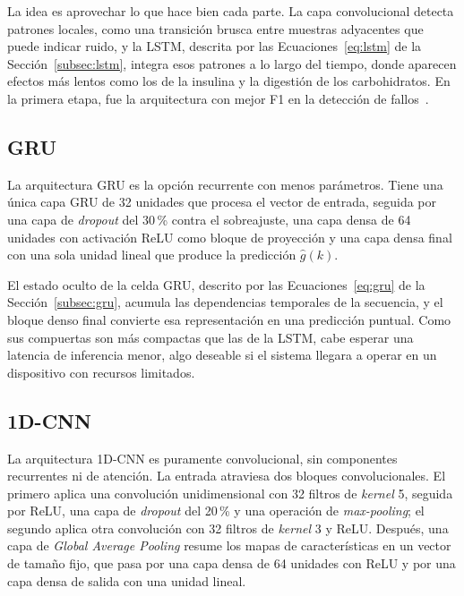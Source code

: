\documentclass{report}
\begin{document}
La idea es aprovechar lo que hace bien cada parte. La capa convolucional detecta patrones locales, como una transición brusca entre muestras adyacentes que puede indicar ruido, y la LSTM, descrita por las Ecuaciones~\eqref{eq:lstm} de la Sección~\ref{subsec:lstm}, integra esos patrones a lo largo del tiempo, donde aparecen efectos más lentos como los de la insulina y la digestión de los carbohidratos. En la primera etapa, fue la arquitectura con mejor F1 en la detección de fallos~\cite{sanchez2025imputation}.

\subsection{GRU}
\label{subsec:arq_gru}

La arquitectura GRU es la opción recurrente con menos parámetros. Tiene una única capa GRU de 32 unidades que procesa el vector de entrada, seguida por una capa de \textit{dropout} del 30\,\% contra el sobreajuste, una capa densa de 64 unidades con activación ReLU como bloque de proyección y una capa densa final con una sola unidad lineal que produce la predicción $\hat{g}(k)$.

El estado oculto de la celda GRU, descrito por las Ecuaciones~\eqref{eq:gru} de la Sección~\ref{subsec:gru}, acumula las dependencias temporales de la secuencia, y el bloque denso final convierte esa representación en una predicción puntual. Como sus compuertas son más compactas que las de la LSTM, cabe esperar una latencia de inferencia menor, algo deseable si el sistema llegara a operar en un dispositivo con recursos limitados.


\subsection{1D-CNN}
\label{subsec:arq_1dcnn}

La arquitectura 1D-CNN es puramente convolucional, sin componentes recurrentes ni de atención. La entrada atraviesa dos bloques convolucionales. El primero aplica una convolución unidimensional con 32 filtros de \textit{kernel} 5, seguida por ReLU, una capa de \textit{dropout} del 20\,\% y una operación de \textit{max-pooling}; el segundo aplica otra convolución con 32 filtros de \textit{kernel} 3 y ReLU. Después, una capa de \textit{Global Average Pooling} resume los mapas de características en un vector de tamaño fijo, que pasa por una capa densa de 64 unidades con ReLU y por una capa densa de salida con una unidad lineal.
\end{document}
